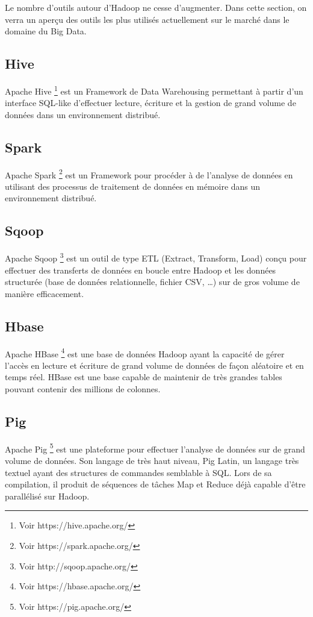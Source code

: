 \documentclass[12pt,french]{book}
\begin{document}
Le nombre d’outils autour d’Hadoop ne cesse d’augmenter. Dans cette section, on verra un aperçu des outils les plus utilisés actuellement sur le marché dans le domaine du Big Data.


\subsection{Hive}

Apache Hive \footnote{Voir https://hive.apache.org/} est un Framework de Data Warehousing permettant à partir d’un interface SQL-like d’effectuer lecture, écriture et   la gestion de grand volume de données dans un environnement distribué.

\subsection{Spark}

Apache Spark \footnote{Voir https://spark.apache.org/} est un Framework pour procéder à de l’analyse de données en utilisant des processus de traitement de données en mémoire dans un environnement distribué.

\subsection{Sqoop}

Apache Sqoop \footnote{Voir http://sqoop.apache.org/} est un outil de type ETL (Extract, Transform, Load) conçu pour effectuer des transferts de données en boucle entre Hadoop et les données structurée (base de données relationnelle, fichier CSV, …) sur de gros volume de manière efficacement.  

\subsection{Hbase}

Apache HBase \footnote{Voir https://hbase.apache.org/} est une base de données Hadoop ayant la capacité de gérer l’accès en lecture et écriture de grand volume de données de façon aléatoire et en temps réel. HBase est une base capable de maintenir de très grandes tables pouvant contenir des millions de colonnes.    

\subsection{Pig}

Apache Pig \footnote{Voir https://pig.apache.org/} est une plateforme pour effectuer l’analyse de données sur de grand volume de données. Son langage de très haut niveau, Pig Latin, un langage très textuel ayant des structures de commandes semblable à SQL. Lors de sa compilation, il produit de séquences de tâches Map et Reduce déjà capable d’être parallélisé sur Hadoop.  
\end{document}
